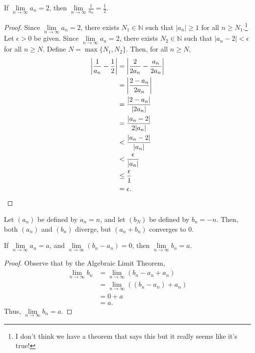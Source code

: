 \documentclass[12pt]{article}
\begin{document}
\newpage
{} If $\lim\limits_{n\to\infty}a_n=2$, then $\lim\limits_{n\to\infty}\frac1{a_n} = \frac12$.
\begin{proof} Since $\lim\limits_{n\to\infty}a_n=2$, there exists $N_1 \in \mathbb N$ such that $|a_n| \geq 1$ for all $n \geq N_1$.\footnote{I don't think we have a theorem that says this but it really seems like it's true!} Let $\epsilon > 0$ be given. Since $\lim\limits_{n\to\infty}a_n=2$, there exists $N_2 \in \mathbb N$ such that $|a_n - 2| < \epsilon$ for all $n \geq N$. Define $N = \max\{N_1, N_2\}$. Then, for all $n \geq N$,
    \begin{align*}
        \bigg{|}\frac1{a_n} - \frac12\bigg{|} &= \bigg{|}\frac{2}{2a_n} - \frac{a_n}{2a_n}\bigg{|} \\
                                              &= \bigg{|}\frac{2 - a_n}{2a_n}\bigg{|} \\
                                              &= \frac{|2 - a_n|}{|2a_n|} \\
                                              &= \frac{|a_n - 2|}{2|a_n|} \\
                                              &< \frac{|a_n - 2|}{|a_n|} \\
                                              &< \frac\epsilon{|a_n|} \\
                                              &\leq \frac\epsilon1 \\
                                              &= \epsilon.
    \end{align*}
\end{proof}

\newpage
{} Let $(a_n)$ be defined by $a_n = n$, and let $(b_N)$ be defined by $b_n = -n$. Then, both $(a_n)$ and $(b_n)$ diverge, but $(a_n + b_n)$ converges to $0$.

\newpage
{} If $\lim\limits_{n\to\infty}a_n = a$, and $\lim\limits_{n\to\infty}(b_n-a_n) = 0$, then $\lim\limits_{n\to\infty}b_n=a$.
\begin{proof}
    Observe that by the Algebraic Limit Theorem,
    \begin{align*}
        \lim\limits_{n\to\infty} b_n &= \lim\limits_{n\to\infty} (b_n-a_n + a_n) \\
                                     &= \lim\limits_{n\to\infty} ((b_n-a_n) + a_n) \\
                                     &= 0 + a \\
                                     &= a.
    \end{align*}
    Thus, $\lim\limits_{n\to\infty}b_n = a$.
\end{proof}
\end{document}
